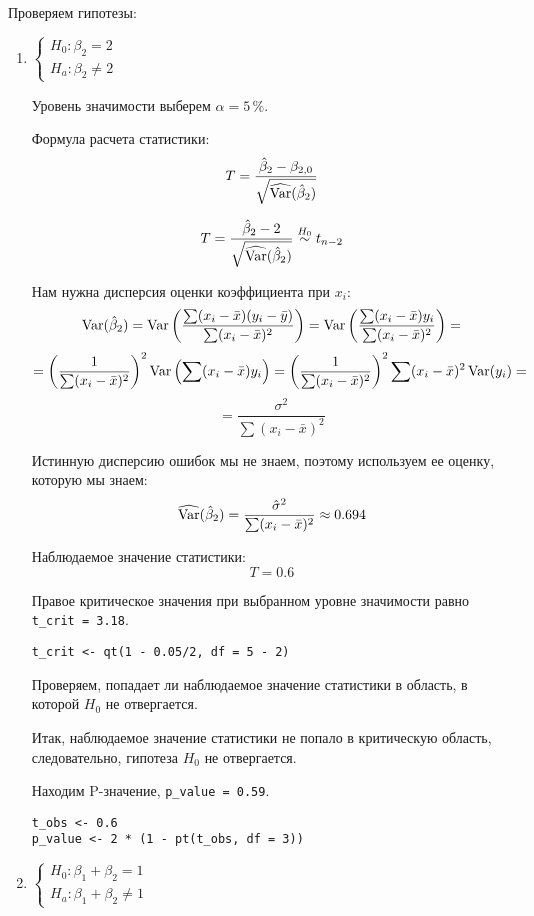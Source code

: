 \begin{problem}
\begin{sol}
Проверяем гипотезы:
\begin{enumerate}
\item \( \begin{cases}
H_0: \beta_2 = 2 \\
H_a: \beta_2 \ne 2
\end{cases}\)

Уровень значимости выберем \(\alpha = 5\,\%\).

Формула расчета статистики:
\[T = \frac{\hat{\beta}_2 - \beta_{2, 0}}{\sqrt{\widehat{\operatorname{Var}} (\hat{\beta}_2)}}\]

\[T = \frac{\hat{\beta}_2 - 2}{\sqrt{\widehat{\operatorname{Var}} (\hat{\beta}_2)}} \overset{H_0}{\sim} t_{n-2} \]

Нам нужна дисперсия оценки коэффициента при \(x_i\):
\[\operatorname{Var}(\hat{\beta}_2) = \operatorname{Var} \left(\frac{\sum (x_i - \bar{x})(y_i - \bar{y})}{\sum (x_i - \bar{x})^2} \right) = \operatorname{Var} \left( \frac{\sum (x_i - \bar{x})y_i }{\sum (x_i - \bar{x})^2} \right) = \]
\[= \left(\frac{1}{\sum (x_i - \bar{x})^2} \right)^2 \operatorname{Var} \left( \sum (x_i - \bar{x})y_i \right)= \left(\frac{1}{\sum (x_i - \bar{x})^2} \right)^2 \sum (x_i - \bar{x})^2 \operatorname{Var} (y_i) =\]
\[= \frac{\sigma^2}{\sum (x_i - \bar{x})^2}  \]

Истинную дисперсию ошибок мы не знаем, поэтому используем ее оценку, которую мы знаем:
\[\widehat{\operatorname{Var}}(\hat{\beta}_2) =  \frac{\hat{\sigma}^2}{\sum (x_i - \bar{x})^2} \approx 0.694  \]

Наблюдаемое значение статистики:
\[T = 0.6 \]

Правое критическое значения при выбранном уровне значимости равно \verb|t_crit = 3.18|.
\begin{verbatim}
t_crit <- qt(1 - 0.05/2, df = 5 - 2)
\end{verbatim}

Проверяем, попадает ли наблюдаемое значение статистики в область, в которой \(H_0\) не отвергается.

Итак, наблюдаемое значение статистики не попало в критическую область, следовательно, гипотеза \(H_0\) не отвергается.

Находим P-значение, \verb|p_value = 0.59|.
\begin{verbatim}
t_obs <- 0.6
p_value <- 2 * (1 - pt(t_obs, df = 3))
\end{verbatim}

\item \( \begin{cases}
H_0: \beta_1 + \beta_2 = 1 \\
H_a: \beta_1 + \beta_2 \ne 1
\end{cases}\)


\end{enumerate}
\end{sol}
\end{problem}
